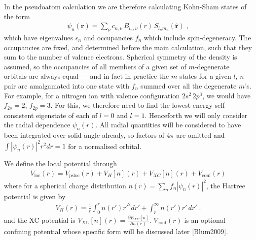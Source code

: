 \documentclass[letterpaper,10pt,english]{sphinxmanual}
\begin{document}
In the pseudoatom calculation we are therefore calculating Kohn-Sham
states of the form
\begin{equation*}
\begin{split}\psi_{n}(\mathbf{r})=\sum_{\nu}c_{n,\nu}\, B_{l_{n},\nu}(r)\, S_{l_{n}m_{n}}(\hat{\mathbf{r}})\;,\end{split}
\end{equation*}
which have eigenvalues \(\epsilon_{n}\) and occupancies
\(f_{n}\) which include spin-degeneracy. The occupancies are fixed,
and determined before the main calculation, such that they sum to the
number of valence electrons. Spherical symmetry of the density is
assumed, so the occupancies of all members of a given set of
\(m\)-degenerate orbitals are always equal — and in fact in practice
the \(m\) states for a given \(l\), \(n\) pair are
amalgamated into one state with \(f_{n}\) summed over all the
degenerate \(m\)’s. For example, for a nitrogen ion with valence
configuration \(2s^{2}\,2p^{3}\), we would have \(f_{2s}=2\),
\(f_{2p}=3\). For this, we therefore need to find the lowest-energy
self-consistent eigenstate of each of \(l=0\) and \(l=1\).
Henceforth we will only consider the radial dependence
\(\psi_{n}(r)\). All radial quantities will be considered to have
been integrated over solid angle already, so factors of \(4\pi\) are
omitted and \(\int|\psi_{n}(r)|^{2}r^{2}dr=1\) for a normalised
orbital.

We define the local potential through
\begin{equation*}
\begin{split}V_{\mathrm{loc}}(r)=V_{\mathrm{psloc}}(r)+V_{H}[n](r)+V_{XC}[n](r)+V_{\mathrm{conf}}(r)\end{split}
\end{equation*}
where for a spherical charge distribution
\(n(r)=\sum_{n}f_{n}|\psi_{n}(r)|^{2}\), the Hartree potential is
given by
\begin{equation*}
\begin{split}V_{H}(r)=\frac{1}{r}\int_{0}^{r}n(r')r'^{2}dr'+\int_{r}^{\infty}n(r')r'\, dr'\;.\end{split}
\end{equation*}
and the XC potential is
\(V_{XC}[n](r)=\frac{\partial E_{XC}[n]}{\partial n(r)}\).
\(V_{\mathrm{conf}}(r)\) is an optional confining potential whose
specific form will be discussed later {[}Blum2009{]}.
\end{document}

